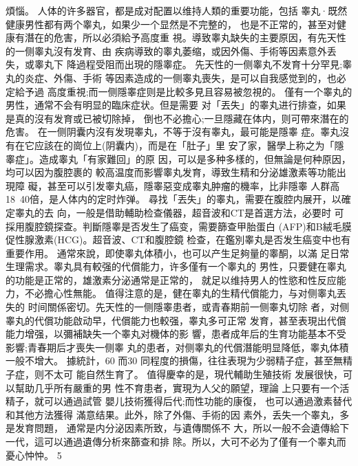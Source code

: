 \documentclass[12pt,UTF8]{ctexbook}
\begin{document}
煩惱。
人体的许多器官，都是成对配置以维持人類的重要功能，包括
睾丸·既然健康男性都有两个睾丸，如果少一个显然是不完整的，
也是不正常的，甚至对健康有潛在的危害，所以必須給予高度重
視。導致睾丸缺失的主要原因，有先天性的一侧睾丸沒有发育、由
疾病導致的睾丸萎缩，或因外傷、手術等因素意外丢失，或睾丸下
降過程受阻而出現的隱睾症。
先天性的一侧睾丸不发育十分罕見;睾丸的炎症、外傷、手術
等因素造成的一侧睾丸喪失，是可以自我感觉到的，也必定給予過
高度重視;而一侧隱睾症则是比較多見且容易被忽視的。
僅有一个睾丸的男性，通常不会有明显的臨床症状。但是需要
对「丟失」的睾丸进行排查，如果是真的沒有发育或已被切除掉，
倒也不必擔心;一旦隱藏在体内，则可帶來潛在的危害。
在一侧阴囊内沒有发現睾丸，不等于沒有睾丸，最可能是隱睾
症。睾丸沒有在它应該在的崗位上(阴囊内)，而是在「肚子」里
安了家，醫學上称之为「隱睾症」。造成睾丸「有家難回」的原
因，可以是多种多樣的，但無論是何种原因，均可以因为腹腔裹的
較高温度而影響睾丸发育，導致生精和分泌雄激素等功能出現障
礙，甚至可以引发睾丸癌，隱睾惡变成睾丸肿瘤的機率，比非隱睾
人群高18~40倍，是人体内的定时炸弹。
尋找「丟失」的睾丸，需要在腹腔内展开，以確定睾丸的去
向，一般是借助輔助检查儀器，超音波和CT是首選方法，必要时
可採用腹腔鏡探查。判斷隱睾是否发生了癌变，需要篩查甲胎蛋白
(AFP)和B絨毛膜促性腺激素(HCG)。超音波、CT和腹腔鏡
检查，在鑑別睾丸是否发生癌变中也有重要作用。
通常來說，即使睾丸体積小，也可以产生足夠量的睾酮，以滿
足日常生理需求。睾丸具有較强的代償能力，许多僅有一个睾丸的
男性，只要健在睾丸的功能是正常的，雄激素分泌通常是正常的，
就足以维持男人的性慾和性反应能力，不必擔心性無能。
值得注意的是，健在睾丸的生精代償能力，与对侧睾丸丟失的
时间關係密切。先天性的一侧隱睾患者，或青春期前一侧睾丸切除
者，对侧睾丸的代償功能啟动早，代償能力也較强，睾丸多可正常
发育，甚至表現出代償能力增强，以彌補缺失一个睾丸对機体的影
響，患者成年后的生育功能基本不受影響;青春期后才喪失一侧睾
丸的患者，对侧睾丸的代償潛能明显降低，睾丸体積一般不增大。
據統計，60%
而30%
同程度的損傷，往往表現为少弱精子症，甚至無精子症，则不太可
能自然生育了。
值得慶幸的是，現代輔助生殖技術
发展很快，可以幫助几乎所有嚴重的男
性不育患者，實現为人父的願望，理論
上只要有一个活精子，就可以通過試管
嬰儿技術獲得后代;而性功能的康復，
也可以通過激素替代和其他方法獲得
滿意结果。此外，除了外傷、手術的因
素外，丢失一个睾丸，多是发育問題，
通常是内分泌因素所致，与遺傳關係不
大，所以一般不会遺傳給下一代，這可以通過遺傳分析來篩查和排
除。所以，大可不必为了僅有一个睾丸而憂心忡忡。
5
\end{document}
